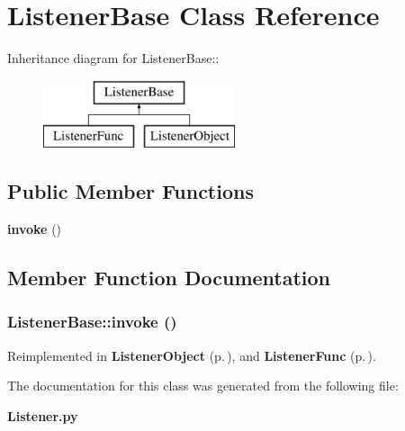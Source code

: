 \section{Listener\-Base Class Reference}
\label{classListenerBase}
Inheritance diagram for Listener\-Base::\begin{figure}[H]
\begin{center}
\leavevmode
\includegraphics[height=2cm]{classListenerBase}
\end{center}
\end{figure}
\subsection*{Public Member Functions}
\begin{CompactItemize}
\item 
{\bf invoke} ()
\end{CompactItemize}


\subsection{Member Function Documentation}
\subsubsection{\setlength{\rightskip}{0pt plus 5cm}Listener\-Base::invoke ()}\label{classListenerBase_ListenerBasea0}




Reimplemented in {\bf Listener\-Object} {\rm (p.\,\pageref{classListenerObject_ListenerObjecta0})}, and {\bf Listener\-Func} {\rm (p.\,\pageref{classListenerFunc_ListenerFunca1})}.

The documentation for this class was generated from the following file:\begin{CompactItemize}
\item 
{\bf Listener.py}\end{CompactItemize}
